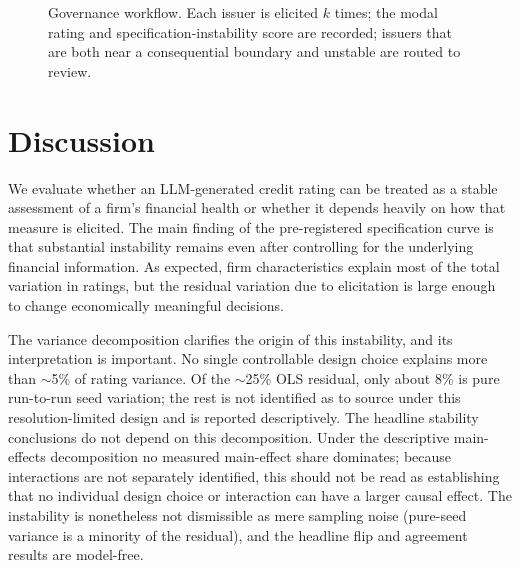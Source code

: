 \documentclass[a4paper,fleqn]{cas-sc}
\begin{document}
\begin{figure}[t]\centering
{}
\caption{Governance workflow. Each issuer is elicited $k$ times; the modal rating and specification-instability
score are recorded; issuers that are both near a consequential boundary and unstable are routed to review.}
\label{fig:governance}
\end{figure}

\section{Discussion}
We evaluate whether an LLM-generated credit rating can be treated as a stable assessment of a firm's
financial health or whether it depends heavily on how that measure is elicited. The main finding of the
pre-registered specification curve is that substantial instability remains even after controlling for the
underlying financial information. As expected, firm characteristics explain most of the total variation
in ratings, but the residual variation due to elicitation is large enough to change economically
meaningful decisions.

The variance decomposition clarifies the origin of this instability, and its interpretation is important.
No single controllable design choice explains more than $\sim$5\% of rating variance. Of the $\sim$25\%
OLS residual, only about 8\% is pure run-to-run seed variation; the rest is not identified as to
source under this resolution-limited design and is reported descriptively. The headline stability
conclusions do not depend on this decomposition. Under the descriptive main-effects decomposition no
measured main-effect share dominates; because interactions are not separately identified, this should not
be read as establishing that no individual design choice or interaction can have a larger causal effect.
The instability is nonetheless not dismissible as mere sampling noise (pure-seed variance is a minority of
the residual), and the headline flip and agreement results are model-free.
\end{document}
